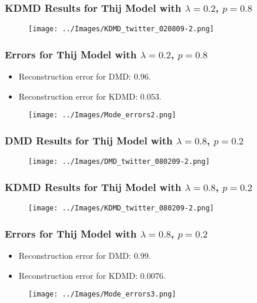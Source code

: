 \documentclass{beamer}
\begin{document}
\begin{frame}
    \frametitle{KDMD Results for Thij Model with $\lambda=0.2$, $p=0.8$}
    \begin{figure}
        \texttt{[image: ../Images/KDMD\_twitter\_020809-2.png]}
        \centering
    \end{figure}
\end{frame}

\begin{frame}
    \frametitle{Errors for Thij Model with $\lambda=0.2$, $p=0.8$}
    \begin{itemize}
        \item  Reconstruction error for DMD: $0.96$. 
        \item  Reconstruction error for KDMD: $0.053$.
    \end{itemize}
   
    \begin{figure}
        \texttt{[image: ../Images/Mode\_errors2.png]}
        \centering
    \end{figure}
\end{frame}
\begin{frame}
    \frametitle{DMD Results for Thij Model with $\lambda=0.8$, $p=0.2$}
    \begin{figure}
        \texttt{[image: ../Images/DMD\_twitter\_080209-2.png]}
        \centering
    \end{figure}
\end{frame}

\begin{frame}
    \frametitle{KDMD Results for Thij Model with $\lambda=0.8$, $p=0.2$}
    \begin{figure}
        \texttt{[image: ../Images/KDMD\_twitter\_080209-2.png]}
        \centering
    \end{figure}
\end{frame}

\begin{frame}
    \frametitle{Errors for Thij Model with $\lambda=0.8$, $p=0.2$}
    \begin{itemize}
        \item  Reconstruction error for DMD: $0.99$. 
        \item  Reconstruction error for KDMD: $0.0076$.
    \end{itemize}
   
    \begin{figure}
        \texttt{[image: ../Images/Mode\_errors3.png]}
        \centering
    \end{figure}
\end{frame}
\end{document}
